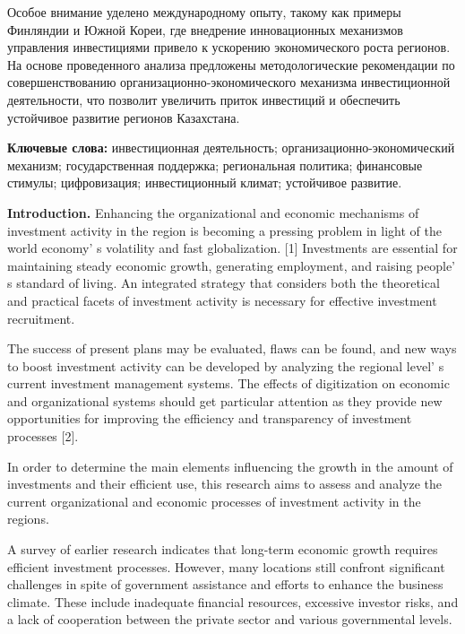 Особое внимание уделено международному опыту, такому как примеры
Финляндии и Южной Кореи, где внедрение инновационных механизмов
управления инвестициями привело к ускорению экономического роста
регионов. На основе проведенного анализа предложены методологические
рекомендации по совершенствованию организационно-экономического
механизма инвестиционной деятельности, что позволит увеличить приток
инвестиций и обеспечить устойчивое развитие регионов Казахстана.

{\bfseries Ключевые слова:} инвестиционная деятельность;
организационно-экономический механизм; государственная поддержка;
региональная политика; финансовые стимулы; цифровизация; инвестиционный
климат; устойчивое развитие.

{\bfseries Introduction.} Enhancing the organizational and economic
mechanisms of investment activity in the region is becoming a pressing
problem in light of the world economy' s volatility and
fast globalization. {[}1{]} Investments are essential for maintaining
steady economic growth, generating employment, and raising
people' s standard of living. An integrated strategy that
considers both the theoretical and practical facets of investment
activity is necessary for effective investment recruitment.

The success of present plans may be evaluated, flaws can be found, and
new ways to boost investment activity can be developed by analyzing the
regional level' s current investment management systems.
The effects of digitization on economic and organizational systems
should get particular attention as they provide new opportunities for
improving the efficiency and transparency of investment processes
{[}2{]}.

In order to determine the main elements influencing the growth in the
amount of investments and their efficient use, this research aims to
assess and analyze the current organizational and economic processes of
investment activity in the regions.

A survey of earlier research indicates that long-term economic growth
requires efficient investment processes. However, many locations still
confront significant challenges in spite of government assistance and
efforts to enhance the business climate. These include inadequate
financial resources, excessive investor risks, and a lack of cooperation
between the private sector and various governmental levels.

